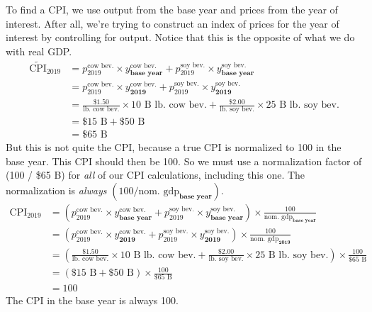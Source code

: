 \documentclass{assignment}
\begin{document}
\begin{enumerate}
\begin{enumerate}
\begin{solution}
To find a CPI, we use output from the base year and prices from the year of interest. After all, we're trying to construct an index of prices for the year of interest by controlling for output. Notice that this is the opposite of what we do with real GDP.
\begin{align*}
\widetilde{\text{CPI}}_{\text{2019}} &= 
p^{\text{cow bev.}}_{\text{2019}} \times y^{\text{cow bev.}}_{\textbf{base year}} +
p^{\text{soy bev.}}_{\text{2019}} \times y^{\text{soy bev.}}_{\textbf{base year}} \\
 &= 
p^{\text{cow bev.}}_{\text{2019}} \times y^{\text{cow bev.}}_{\textbf{2019}} +
p^{\text{soy bev.}}_{\text{2019}} \times y^{\text{soy bev.}}_{\textbf{2019}} \\
 &= 
\frac{\$1.50}{\text{lb.~cow bev.}} \times 10 \text{~B~lb.~cow bev.} +
\frac{\$2.00}{\text{lb.~soy bev.}} \times 25 \text{~B~lb.~soy bev.} \\
 &= \$15 \text{~B} + \$50 \text{~B} \\
 &= \$65 \text{~B}
\end{align*}
But this is not quite the CPI, because a true CPI is normalized to 100 in the base year. This CPI should then be 100. So we must use a normalization factor of (100 / \$65 B) for \emph{all} of our CPI calculations, including this one. The normalization is \emph{always} $(100 / \text{nom.~gdp}_{\textbf{base year}})$.
\begin{align*}
\text{CPI}_{\text{2019}} &= 
\left( p^{\text{cow bev.}}_{\text{2019}} \times y^{\text{cow bev.}}_{\textbf{base year}} +
p^{\text{soy bev.}}_{\text{2019}} \times y^{\text{soy bev.}}_{\textbf{base year}} \right) \times \frac{100}{\text{nom.~gdp}_{\textbf{base year}}} \\
 &= 
\left( p^{\text{cow bev.}}_{\text{2019}} \times y^{\text{cow bev.}}_{\textbf{2019}} +
p^{\text{soy bev.}}_{\text{2019}} \times y^{\text{soy bev.}}_{\textbf{2019}} \right) \times \frac{100}{\text{nom.~gdp}_{\textbf{2019}}} \\
 &= 
\left( \frac{\$1.50}{\text{lb.~cow bev.}} \times 10 \text{~B~lb.~cow bev.} +
\frac{\$2.00}{\text{lb.~soy bev.}} \times 25 \text{~B~lb.~soy bev.} \right) \times \frac{100}{\$65 \text{~B}} \\
 &= \left( \$15 \text{~B} + \$50 \text{~B} \right) \times \frac{100}{\$65 \text{~B}} \\
 &= 100
\end{align*}
The CPI in the base year is always 100.
\end{solution}


\end{enumerate}
\end{enumerate}
\end{document}
